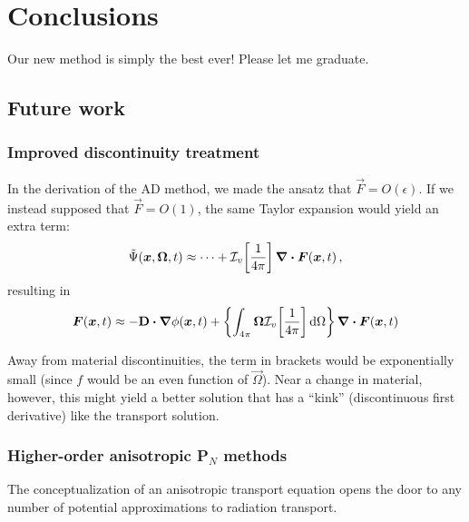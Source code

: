 
\chapter{Conclusions}\label{chap:conclusion}

Our new method is simply the best ever! Please let me graduate.

\section{Future work}
\subsection{Improved discontinuity treatment}
In the derivation of the AD method, we made the ansatz that
$\vec{F}=O(\epsilon)$. If we instead supposed that $\vec{F}=O(1)$, the same
Taylor expansion would yield an extra term:
\begin{equation*}
  \tilde\Psi(\bm{x}, \bm{\Omega}, t)
  \approx \cdots + \mathcal{I}_{v}\!\left[ \frac1{4\pi} \right] \bm{\nabla} \bm{\cdot} \bm{F}(\bm{x},t)\,,
\end{equation*}
resulting in
\begin{equation*}
  \bm{F}(\bm{x}, t)
  \approx - \mathbf{D} \bm{\cdot} \bm{\nabla} \phi(\bm{x},t)
  + \left\{ \int_{4\pi} \bm{\Omega} \mathcal{I}_{v}\!\left[ \frac1{4\pi} \right] \mathop{}\!\mathrm{d}\Omega
  \right\} \bm{\nabla} \bm{\cdot} \bm{F}(\bm{x},t)
\end{equation*}

Away from material discontinuities, the term in brackets would be
exponentially small (since $f$ would be an even function of $\vec{\Omega}$).
Near a change in material, however, this might yield a better solution that has
a ``kink'' (discontinuous first derivative) like the transport solution.

\subsection{Higher-order anisotropic P$_N$ methods}
The conceptualization of an anisotropic transport equation opens the door to
any number of potential approximations to radiation transport.

